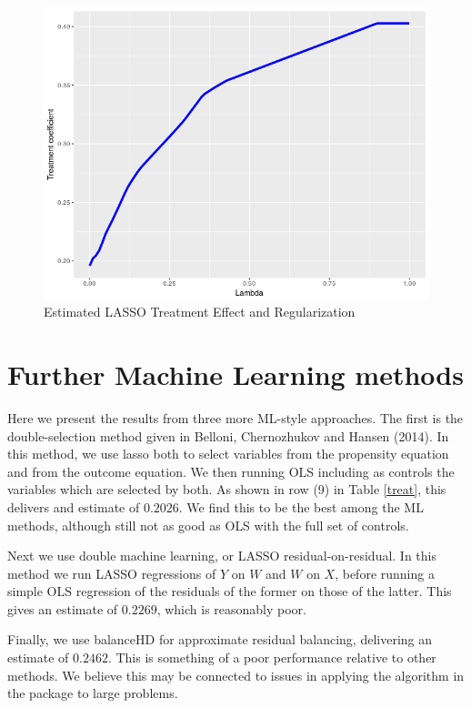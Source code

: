 \documentclass[paper=letter, fontsize=11pt]{scrartcl} %
\begin{document}
\begin{figure}[!ht]
\center
\caption{Estimated LASSO Treatment Effect and Regularization  \label{lasso_coef}}
\includegraphics[scale=0.8]{treat_coef_lasso.png}
\end{figure}

\section{Further Machine Learning methods}

Here we present the results from three more ML-style approaches. The first is the double-selection method given in Belloni, Chernozhukov and Hansen (2014). In this method, we use lasso both to select variables from the propensity equation and from the outcome equation. We then running OLS including as controls the variables which are selected by both. As shown in row (9) in Table \ref{treat}, this delivers and estimate of $0.2026$. We find this to be the best among the ML methods, although still not as good as OLS with the full set of controls.

Next we use double machine learning, or LASSO residual-on-residual. In this method we run LASSO regressions of $Y$ on $W$ and $W$ on $X$, before running a simple OLS regression of the residuals of the former on those of the latter. This gives an estimate of $0.2269$, which is reasonably poor.

Finally, we use balanceHD for approximate residual balancing, delivering an estimate of $0.2462$. This is something of a poor performance relative to other methods. We believe this may be connected to issues in applying the algorithm in the package to large problems. 
\end{document}

